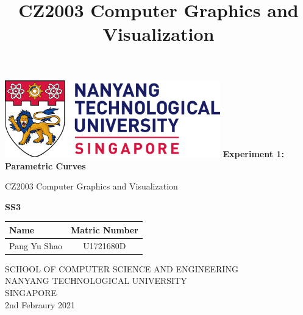 \documentclass[acmlarge,nonacm=true]{acmart}
\begin{document}
	
	\begin{titlepage}
		\begin{center}
			\vspace*{1cm}
			\includegraphics[width=0.7\textwidth]{fig/ntu_logo}
			\vspace{0.8cm}
			\linebreak
			\Huge
			\textbf{Experiment 1: Parametric Curves}
			
			\vspace{0.5cm}
			\LARGE
			CZ2003 Computer Graphics and Visualization
			
			\vspace{1.5cm}
			\textbf{SS3}\\
			
			\begin{table}[h]
				\begin{tabular}{lc}
					Name & Matric Number \\\hline
					Pang Yu Shao & U1721680D \\
				\end{tabular}
			\end{table}
			
			
			
			\vfill
			
			\vspace{0.8cm}
			
			
			
			\Large
			SCHOOL OF COMPUTER SCIENCE AND ENGINEERING\\
			NANYANG TECHNOLOGICAL UNIVERSITY\\
			SINGAPORE\\
			2nd Febraury 2021
			
		\end{center}
	\end{titlepage}

 

\title{CZ2003 Computer Graphics and Visualization}

\end{document}
